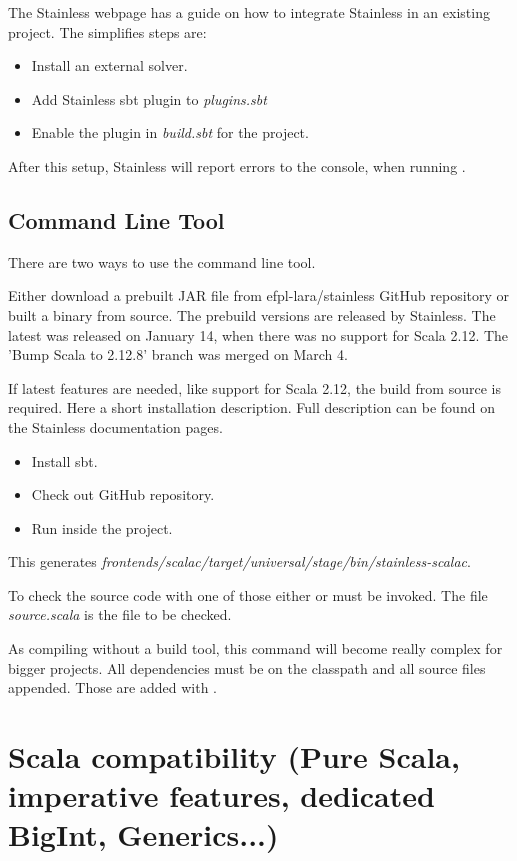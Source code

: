 The Stainless webpage has a guide on how to integrate Stainless in an existing project.
The simplifies steps are:
\begin{itemize}
  \item Install an external solver.
  \item Add Stainless sbt plugin to \emph{plugins.sbt}
  \item Enable the plugin in \emph{build.sbt} for the project.
\end{itemize}
After this setup, Stainless will report errors to the console, when running .

\subsection{Command Line Tool}
There are two ways to use the command line tool.

Either download a prebuilt JAR file from efpl-lara/stainless GitHub repository or built a binary from source.
The prebuild versions are released by Stainless.
The latest was released on January 14, when there was no support for Scala 2.12.
The 'Bump Scala to 2.12.8' branch was merged on March 4.

If latest features are needed, like support for Scala 2.12, the build from source is required.
Here a short installation description.
Full description can be found on the Stainless documentation pages.
\begin{itemize}
  \item Install sbt.
  \item Check out GitHub repository.
  \item Run  inside the project.
\end{itemize}
This generates \emph{frontends/scalac/target/universal/stage/bin/stainless-scalac}.

To check the source code with one of those either  or  must be invoked.
The file \emph{source.scala} is the file to be checked.

As compiling without a build tool, this command will become really complex for bigger projects.
All dependencies must be on the classpath and all source files appended.
Those are added with .

\section{Scala compatibility (Pure Scala, imperative features, dedicated BigInt, Generics...)}

